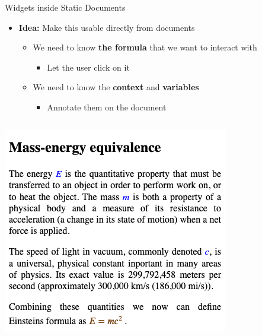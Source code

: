 \documentclass{beamer}
\begin{document}
    \begin{frame}[fragile]{Widgets inside Static Documents}
        \begin{itemize}
            \item \textbf{Idea: } Make this usable directly from documents
            \begin{itemize}
                \item We need to know \textbf{the formula} that we want to interact with
                \begin{itemize}
                    \item Let the user click on it
                \end{itemize}
                \item We need to know the \textbf{context} and \textbf{variables}
                \begin{itemize}
                    \item Annotate them on the document
                \end{itemize}
            \end{itemize}
        \end{itemize}

        \begin{columns}
            \centering
            \includegraphics[scale=0.25]{images/doc}
            
        \end{columns}
    \end{frame}
\end{document}
